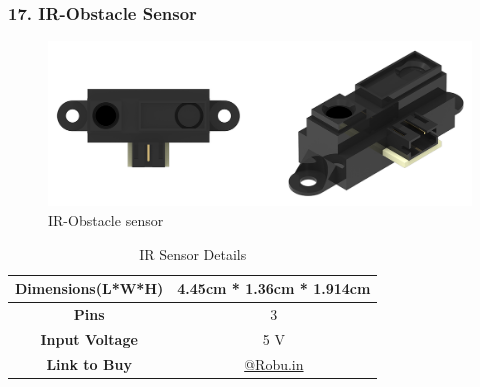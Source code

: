\documentclass[12pt,a4paper,oneside]{book}
\begin{document}
			\subsubsection*{17. IR-Obstacle Sensor}
				\begin{figure}[H]
					\centering
					\includegraphics[scale=1]{IR FULL}
					\caption{IR-Obstacle sensor}	 
				\end{figure}
				\begin{table}[H]
				\centering
				\def\arraystretch{1.5}
					\caption{IR Sensor Details}
					\vspace{0.5cm}
					\begin{tabular}{|c||c|}
						\hline
						\textbf{Dimensions(L*W*H)} & 4.45cm * 1.36cm * 1.914cm\\\hline
						\textbf{Pins} & 3\\\hline
						\textbf{Input Voltage} & 5 V\\\hline
						\textbf{Link to Buy} & \href{https://robu.in/product/sharp-ir-distance-measuring-sensor-unit-4-30-cm-cable/}{@Robu.in}\\\hline
					\end{tabular}
				\end{table}
				\pagebreak
				
\end{document}
